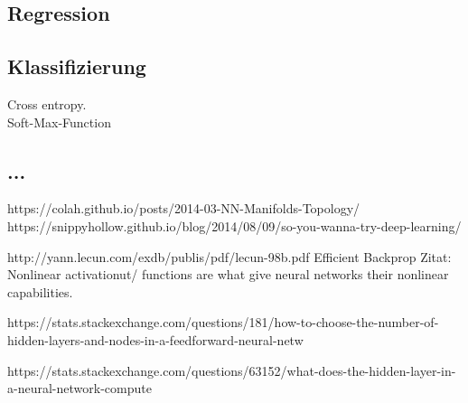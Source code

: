 \subsection{Regression}

\subsection{Klassifizierung}
Cross entropy.
\\
Soft-Max-Function
\\
\subsection{...}
https://colah.github.io/posts/2014-03-NN-Manifolds-Topology/
https://snippyhollow.github.io/blog/2014/08/09/so-you-wanna-try-deep-learning/

http://yann.lecun.com/exdb/publis/pdf/lecun-98b.pdf Efficient Backprop
Zitat: Nonlinear activationut/ functions are what give neural networks their nonlinear capabilities. 

https://stats.stackexchange.com/questions/181/how-to-choose-the-number-of-hidden-layers-and-nodes-in-a-feedforward-neural-netw

https://stats.stackexchange.com/questions/63152/what-does-the-hidden-layer-in-a-neural-network-compute
